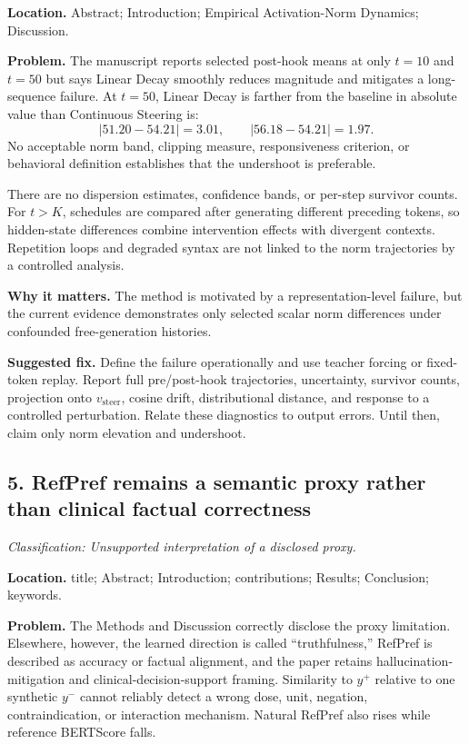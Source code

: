 \documentclass[11pt]{article}
\newcommand{\findinglabel}[1]{\textbf{#1}}
\newcommand{\classification}[1]{\textit{Classification: #1.}}
\begin{document}
\findinglabel{Location.} Abstract; Introduction; Empirical Activation-Norm Dynamics; Discussion.

\findinglabel{Problem.} The manuscript reports selected post-hook means at only $t=10$ and $t=50$ but says Linear Decay smoothly reduces magnitude and mitigates a long-sequence failure.  At $t=50$, Linear Decay is farther from the baseline in absolute value than Continuous Steering is:
\[
|51.20-54.21|=3.01,
\qquad
|56.18-54.21|=1.97.
\]
No acceptable norm band, clipping measure, responsiveness criterion, or behavioral definition establishes that the undershoot is preferable.

There are no dispersion estimates, confidence bands, or per-step survivor counts.  For $t>K$, schedules are compared after generating different preceding tokens, so hidden-state differences combine intervention effects with divergent contexts.  Repetition loops and degraded syntax are not linked to the norm trajectories by a controlled analysis.

\findinglabel{Why it matters.} The method is motivated by a representation-level failure, but the current evidence demonstrates only selected scalar norm differences under confounded free-generation histories.

\findinglabel{Suggested fix.} Define the failure operationally and use teacher forcing or fixed-token replay.  Report full pre/post-hook trajectories, uncertainty, survivor counts, projection onto $v_{\text{steer}}$, cosine drift, distributional distance, and response to a controlled perturbation.  Relate these diagnostics to output errors.  Until then, claim only norm elevation and undershoot.

\subsection*{5. RefPref remains a semantic proxy rather than clinical factual correctness}

\classification{Unsupported interpretation of a disclosed proxy}

\findinglabel{Location.} title; Abstract; Introduction; contributions; Results; Conclusion; keywords.

\findinglabel{Problem.} The Methods and Discussion correctly disclose the proxy limitation.  Elsewhere, however, the learned direction is called ``truthfulness,'' RefPref is described as accuracy or factual alignment, and the paper retains hallucination-mitigation and clinical-decision-support framing.  Similarity to $y^+$ relative to one synthetic $y^-$ cannot reliably detect a wrong dose, unit, negation, contraindication, or interaction mechanism.  Natural RefPref also rises while reference BERTScore falls.
\end{document}
